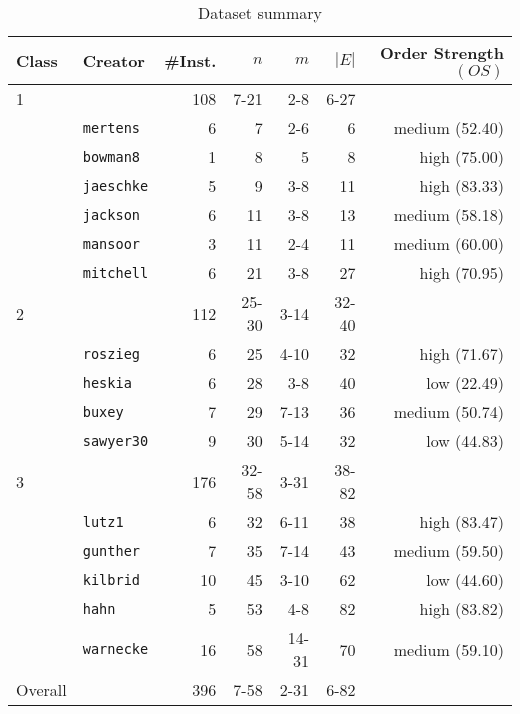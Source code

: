 \begin{table}[tpb]
	\centering
	\caption{Dataset summary}
	\vspace{2mm}
	\begin{tabular}{llrrrrr}
		\toprule
		Class & Creator & \#Inst. & $n$ & $m$ & $|E|$ & Order Strength $(OS)$ \\
		\midrule\midrule
		1 &  & 108 & 7-21 & 2-8 & 6-27 & \\[1mm]
		 & {\tt mertens}  & 6 & 7 & 2-6 & 6 & medium (52.40)\\
		  & {\tt bowman8}  & 1 & 8 & 5 & 8 & high (75.00)\\
		  & {\tt jaeschke} & 5 & 9 & 3-8 & 11 & high (83.33)\\
		  & {\tt jackson}  & 6 & 11 & 3-8 & 13 & medium (58.18)\\
		  & {\tt mansoor}  & 3 & 11 & 2-4 & 11 & medium (60.00)\\
		  & {\tt mitchell} & 6 & 21 & 3-8 & 27 & high (70.95)\\\midrule
		2 &  & 112 & 25-30 & 3-14 & 32-40 & \\[1mm]
		  & {\tt roszieg} & 6 & 25 & 4-10 & 32 & high (71.67)\\
		  & {\tt heskia}   & 6 & 28 & 3-8 & 40 & low (22.49)\\
		  & {\tt buxey}    & 7 & 29 & 7-13 & 36 & medium (50.74)\\
		  & {\tt sawyer30} & 9 & 30 & 5-14 & 32 & low (44.83)\\\midrule
		3 &  & 176 & 32-58 & 3-31 & 38-82 & \\[1mm]
		  & {\tt lutz1}   & 6 & 32 & 6-11 & 38 & high (83.47)\\
		  & {\tt gunther}  & 7 & 35 & 7-14 & 43 & medium (59.50)\\
		  & {\tt kilbrid}  & 10 & 45 & 3-10 & 62 & low (44.60)\\
		  & {\tt hahn}     & 5 & 53 & 4-8 & 82 & high (83.82)\\
		  & {\tt warnecke} & 16 & 58 & 14-31 & 70 & medium (59.10)\\\midrule
		Overall & & 396 & 7-58 & 2-31 & 6-82 & \\
		\bottomrule
	\end{tabular}
	\label{tab:exp:dataSBF2}
\end{table}


